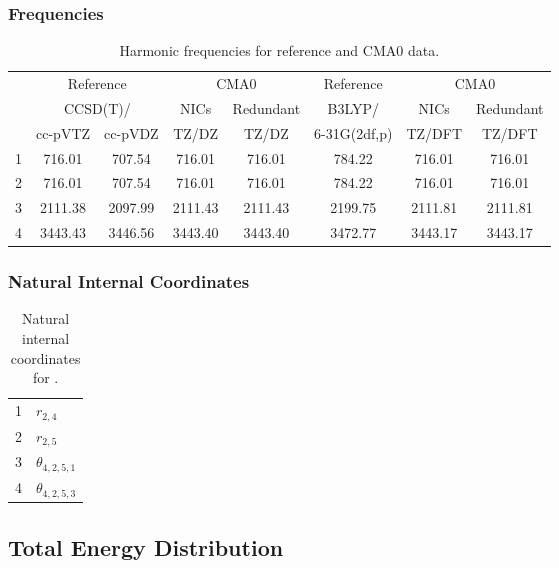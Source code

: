 \documentclass[10pt,oneside]{article}
\begin{document}
\begin{table}[h!]
\subsubsection*{Frequencies}
\centering
\caption{Harmonic frequencies for reference and CMA0 data.}
\begin{tabular}{cccccccc}
\toprule
{} & \multicolumn{2}{c}{Reference} & \multicolumn{2}{c}{CMA0} &    Reference & \multicolumn{2}{c}{CMA0} \\
{} & \multicolumn{2}{c}{CCSD(T)/} &    NICs &  Redundant &       B3LYP/ &    NICs & Redundant \\
{} &   cc-pVTZ & cc-pVDZ &   TZ/DZ &      TZ/DZ & 6-31G(2df,p) &  TZ/DFT &    TZ/DFT \\
\midrule
1 &    716.01 &  707.54 &  716.01 &     716.01 &       784.22 &  716.01 &    716.01 \\
2 &    716.01 &  707.54 &  716.01 &     716.01 &       784.22 &  716.01 &    716.01 \\
3 &   2111.38 & 2097.99 & 2111.43 &    2111.43 &      2199.75 & 2111.81 &   2111.81 \\
4 &   3443.43 & 3446.56 & 3443.40 &    3443.40 &      3472.77 & 3443.17 &   3443.17 \\
\bottomrule
\end{tabular}
\end{table}

\begin{table}[h!]
\subsubsection*{Natural Internal Coordinates}
\centering
\caption{Natural internal coordinates for .}
\small
\begin{tabular}{ll}
\toprule
  1   & $r_{2,4}$ \\
  2   & $r_{2,5}$ \\
  3   & $\theta_{4,2,5,1}$ \\
  4   & $\theta_{4,2,5,3}$ \\
\bottomrule
\end{tabular}
\end{table}

\begin{table}
\subsection*{Total Energy Distribution}
\centering\end{table}
\end{document}
